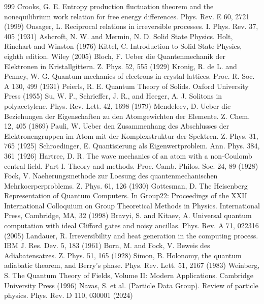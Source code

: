 \begin{thebibliography}{999}
 Crooks, G. E. Entropy production fluctuation theorem and the nonequilibrium work relation for free energy differences. Phys. Rev. E 60, 2721 (1999)
 Onsager, L. Reciprocal relations in irreversible processes. I. Phys. Rev. 37, 405 (1931)
 Ashcroft, N. W. and Mermin, N. D. Solid State Physics. Holt, Rinehart and Winston (1976)
 Kittel, C. Introduction to Solid State Physics, eighth edition. Wiley (2005)
 Bloch, F. Ueber die Quantenmechanik der Elektronen in Kristallgittern. Z. Phys. 52, 555 (1929)
 Kronig, R. de L. and Penney, W. G. Quantum mechanics of electrons in crystal lattices. Proc. R. Soc. A 130, 499 (1931)
 Peierls, R. E. Quantum Theory of Solids. Oxford University Press (1955)
 Su, W. P., Schrieffer, J. R., and Heeger, A. J. Solitons in polyacetylene. Phys. Rev. Lett. 42, 1698 (1979)
 Mendeleev, D. Ueber die Beziehungen der Eigenschaften zu den Atomgewichten der Elemente. Z. Chem. 12, 405 (1869)
 Pauli, W. Ueber den Zusammenhang des Abschlusses der Elektronengruppen im Atom mit der Komplexstruktur der Spektren. Z. Phys. 31, 765 (1925)
 Schroedinger, E. Quantisierung als Eigenwertproblem. Ann. Phys. 384, 361 (1926)
 Hartree, D. R. The wave mechanics of an atom with a non-Coulomb central field. Part I. Theory and methods. Proc. Camb. Philos. Soc. 24, 89 (1928)
 Fock, V. Naeherungsmethode zur Loesung des quantenmechanischen Mehrkoerperproblems. Z. Phys. 61, 126 (1930)
 Gottesman, D. The Heisenberg Representation of Quantum Computers. In Group22: Proceedings of the XXII International Colloquium on Group Theoretical Methods in Physics. International Press, Cambridge, MA, 32 (1998)
 Bravyi, S. and Kitaev, A. Universal quantum computation with ideal Clifford gates and noisy ancillas. Phys. Rev. A 71, 022316 (2005)
 Landauer, R. Irreversibility and heat generation in the computing process. IBM J. Res. Dev. 5, 183 (1961)
 Born, M. and Fock, V. Beweis des Adiabatensatzes. Z. Phys. 51, 165 (1928)
 Simon, B. Holonomy, the quantum adiabatic theorem, and Berry's phase. Phys. Rev. Lett. 51, 2167 (1983)
 Weinberg, S. The Quantum Theory of Fields, Volume II: Modern Applications. Cambridge University Press (1996)
 Navas, S. et al. (Particle Data Group). Review of particle physics. Phys. Rev. D 110, 030001 (2024)

\end{thebibliography}
